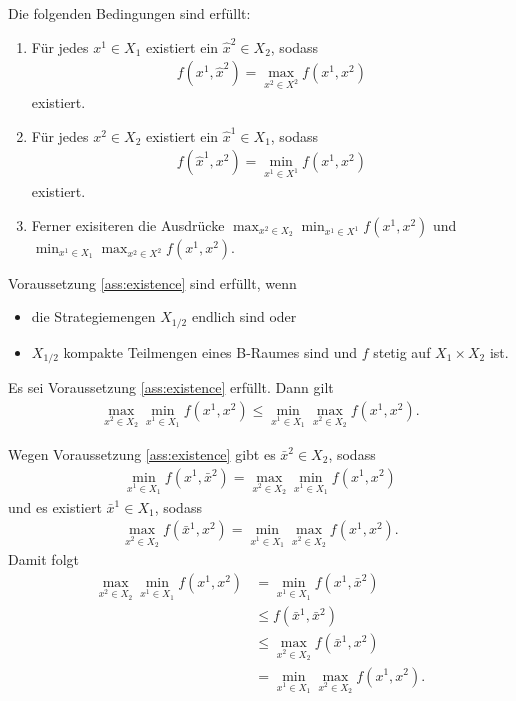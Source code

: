 \begin{voraussetzung}\label{ass:existence} Die folgenden Bedingungen sind erfüllt:
  \begin{enumerate}
  \item Für jedes $x^{1} \in X_{1}$ existiert ein $\hat x^{2} \in X_{2}$, sodass
    \begin{align*}
      f(x^{1}, \hat x^{2}) = \max_{x^{2} \in X^{2}}f(x^{1}, x^{2})
    \end{align*}
existiert. 
\item Für jedes $x^{2} \in X_{2}$ existiert ein $\hat x^{1} \in X_{1}$, sodass
   \begin{align*}
      f(\hat x^{1}, x^{2}) = \min_{x^{1} \in X^{1}}f(x^{1}, x^{2})
    \end{align*}
existiert. 
\item Ferner exisiteren die Ausdrücke $\max_{x^{2} \in X_{2}}\min_{x^{1} \in X^{1}}f(x^{1}, x^{2})$ und $\min_{x^{1} \in X_{1}}\max_{x^{2} \in X^{2}}f(x^{1}, x^{2})$.
  \end{enumerate}
\end{voraussetzung}
\begin{bemerkung*}
  Voraussetzung \ref{ass:existence} sind erfüllt, wenn
  \begin{itemize}
  \item die Strategiemengen $X_{1/2}$ endlich sind oder
  \item $X_{1/2}$ kompakte Teilmengen eines B-Raumes sind und $f$ stetig auf $X_{1} \times X_{2}$ ist.  
  \end{itemize}
\end{bemerkung*}
\begin{lemma}\label{lem:minmax}
  Es sei Voraussetzung \ref{ass:existence} erfüllt. Dann gilt
  \begin{align*}
    \max_{x^{2} \in X_{2}} \min_{x^{1} \in X_{1}} f(x^{1}, x^{2}) \leq \min_{x^{1} \in X_{1}} \max_{x^{2} \in X_{2}} f(x^{1}, x^{2}).
  \end{align*}
\end{lemma}
\begin{beweis}
  Wegen Voraussetzung \ref{ass:existence} gibt es $\bar x^{2} \in X_{2}$, sodass
  \begin{align*}
    \min_{x^{1} \in X_{1}}f(x^{1}, \bar x^{2}) = \max_{x^{2} \in X_{2}}\min_{x^{1} \in X_{1}}f(x^{1}, x^{2})
  \end{align*}
und es existiert $\bar x^{1} \in X_{1}$, sodass
\begin{align*}
    \max_{x^{2} \in X_{2}}f(\bar x^{1}, x^{2}) = \min_{x^{1} \in X_{1}}\max_{x^{2} \in X_{2}} f(x^{1}, x^{2}).
\end{align*}
Damit folgt
\begin{align*}
  \max_{x^{2} \in X_{2}}\min_{x^{1} \in X_{1}}f(x^{1}, x^{2}) &= \min_{x^{1} \in X_{1}}f(x^{1}, \bar x^{2})\\
&\leq f(\bar x^{1}, \bar x^{2})\\
&\leq  \max_{x^{2} \in X_{2}}f(\bar x^{1}, x^{2})\\
&=\min_{x^{1} \in X_{1}}\max_{x^{2} \in X_{2}} f(x^{1}, x^{2}).
\end{align*}
\end{beweis}
